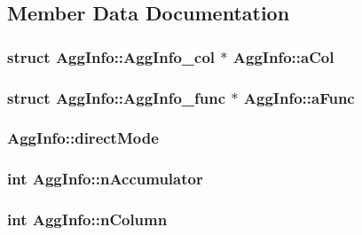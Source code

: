 \subsection{Member Data Documentation}
\hypertarget{struct_agg_info_a52fa1a7eb3145c27be13b2bcccd57d62}{
\subsubsection[{a\-Col}]{\setlength{\rightskip}{0pt plus 5cm}struct {\bf Agg\-Info\-::\-Agg\-Info\-\_\-col} $\ast$ Agg\-Info\-::a\-Col}}\label{struct_agg_info_a52fa1a7eb3145c27be13b2bcccd57d62}
\hypertarget{struct_agg_info_a4e201acd6a1f8aed360c58e45f47c803}{
\subsubsection[{a\-Func}]{\setlength{\rightskip}{0pt plus 5cm}struct {\bf Agg\-Info\-::\-Agg\-Info\-\_\-func} $\ast$ Agg\-Info\-::a\-Func}}\label{struct_agg_info_a4e201acd6a1f8aed360c58e45f47c803}
\hypertarget{struct_agg_info_aaa57d294016ac7e17e7cacaa7b25634e}{
\subsubsection[{direct\-Mode}]{ Agg\-Info\-::direct\-Mode}}\label{struct_agg_info_aaa57d294016ac7e17e7cacaa7b25634e}
\hypertarget{struct_agg_info_ad2251760d95af9024f0a3170405cb53b}{
\subsubsection[{n\-Accumulator}]{\setlength{\rightskip}{0pt plus 5cm}int Agg\-Info\-::n\-Accumulator}}\label{struct_agg_info_ad2251760d95af9024f0a3170405cb53b}
\hypertarget{struct_agg_info_a9cbfa5fc33328cf3500426674e036a8b}{
\subsubsection[{n\-Column}]{\setlength{\rightskip}{0pt plus 5cm}int Agg\-Info\-::n\-Column}}\label{struct_agg_info_a9cbfa5fc33328cf3500426674e036a8b}
